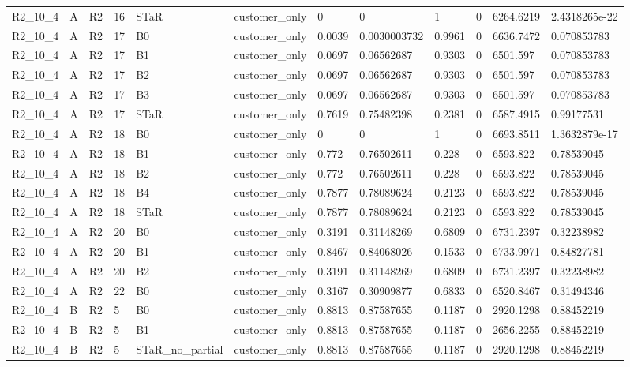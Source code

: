 \begin{longtable}{llllllllllll}
R2\_10\_4 & A & R2 & 16 & STaR & customer\_only & 0 & 0 & 1 & 0 & 6264.6219 & 2.4318265e-22 \\
R2\_10\_4 & A & R2 & 17 & B0 & customer\_only & 0.0039 & 0.0030003732 & 0.9961 & 0 & 6636.7472 & 0.070853783 \\
R2\_10\_4 & A & R2 & 17 & B1 & customer\_only & 0.0697 & 0.06562687 & 0.9303 & 0 & 6501.597 & 0.070853783 \\
R2\_10\_4 & A & R2 & 17 & B2 & customer\_only & 0.0697 & 0.06562687 & 0.9303 & 0 & 6501.597 & 0.070853783 \\
R2\_10\_4 & A & R2 & 17 & B3 & customer\_only & 0.0697 & 0.06562687 & 0.9303 & 0 & 6501.597 & 0.070853783 \\
R2\_10\_4 & A & R2 & 17 & STaR & customer\_only & 0.7619 & 0.75482398 & 0.2381 & 0 & 6587.4915 & 0.99177531 \\
R2\_10\_4 & A & R2 & 18 & B0 & customer\_only & 0 & 0 & 1 & 0 & 6693.8511 & 1.3632879e-17 \\
R2\_10\_4 & A & R2 & 18 & B1 & customer\_only & 0.772 & 0.76502611 & 0.228 & 0 & 6593.822 & 0.78539045 \\
R2\_10\_4 & A & R2 & 18 & B2 & customer\_only & 0.772 & 0.76502611 & 0.228 & 0 & 6593.822 & 0.78539045 \\
R2\_10\_4 & A & R2 & 18 & B4 & customer\_only & 0.7877 & 0.78089624 & 0.2123 & 0 & 6593.822 & 0.78539045 \\
R2\_10\_4 & A & R2 & 18 & STaR & customer\_only & 0.7877 & 0.78089624 & 0.2123 & 0 & 6593.822 & 0.78539045 \\
R2\_10\_4 & A & R2 & 20 & B0 & customer\_only & 0.3191 & 0.31148269 & 0.6809 & 0 & 6731.2397 & 0.32238982 \\
R2\_10\_4 & A & R2 & 20 & B1 & customer\_only & 0.8467 & 0.84068026 & 0.1533 & 0 & 6733.9971 & 0.84827781 \\
R2\_10\_4 & A & R2 & 20 & B2 & customer\_only & 0.3191 & 0.31148269 & 0.6809 & 0 & 6731.2397 & 0.32238982 \\
R2\_10\_4 & A & R2 & 22 & B0 & customer\_only & 0.3167 & 0.30909877 & 0.6833 & 0 & 6520.8467 & 0.31494346 \\
R2\_10\_4 & B & R2 & 5 & B0 & customer\_only & 0.8813 & 0.87587655 & 0.1187 & 0 & 2920.1298 & 0.88452219 \\
R2\_10\_4 & B & R2 & 5 & B1 & customer\_only & 0.8813 & 0.87587655 & 0.1187 & 0 & 2656.2255 & 0.88452219 \\
R2\_10\_4 & B & R2 & 5 & STaR\_no\_partial & customer\_only & 0.8813 & 0.87587655 & 0.1187 & 0 & 2920.1298 & 0.88452219 \\

\end{longtable}

